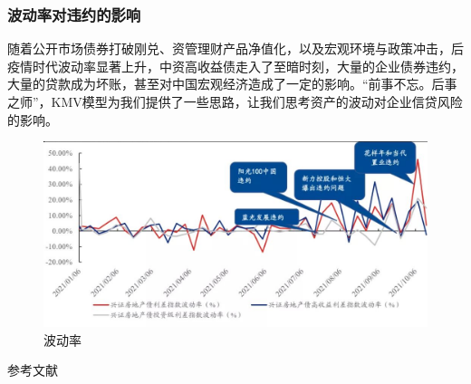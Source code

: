 \documentclass{ctexbeamer}
\begin{document}
\begin{frame}
    \frametitle{波动率对违约的影响}
    随着公开市场债券打破刚兑、资管理财产品净值化，以及宏观环境与政策冲击，后疫情时代波动率显著上升，中资高收益债走入了至暗时刻，大量的企业债券违约，大量的贷款成为坏账，甚至对中国宏观经济造成了一定的影响。“前事不忘。后事之师”，KMV模型为我们提供了一些思路，让我们思考资产的波动对企业信贷风险的影响。
    \begin{figure}
        \includegraphics[width=0.8\linewidth, trim=0 20 0 0]{fig/波动率.jpeg}
        \caption{波动率}
    \end{figure}
\end{frame}

\nocite{*}
\appendix
\begin{frame}[allowframebreaks]{参考文献}
    \nocite{*}
    \tiny{\printbibliography[heading=bibliography,title=参考文献]}
\end{frame}
\end{document}
